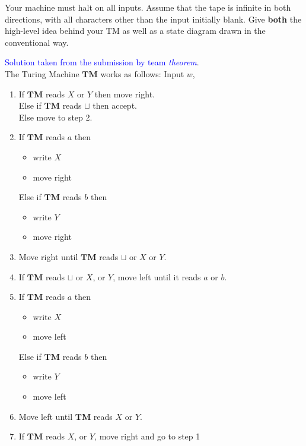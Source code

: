 \documentclass[a4page]{exam}
\begin{document}
\begin{questions}
  Your machine must halt on all inputs. Assume that the tape is infinite in both directions, with all characters other than the input initially blank. Give \textbf{both} the high-level idea behind your TM as well as a state diagram drawn in the conventional way. 
  \begin{solution}
    \textcolor{blue}{Solution taken from the submission by team \textit{theorem}}.\\
    The Turing Machine $\mathbf{TM}$ works as follows: Input $w$,
    \begin{enumerate}
    \item If $\mathbf{TM}$ reads $X$ or $Y$ then move right.\\
      Else if $\mathbf{TM}$ reads $\sqcup$ then accept. \\
      Else move to step 2. 
    \item If $\mathbf{TM}$ reads $a$ then
      \begin{itemize}
      \item write $X$
      \item move right
      \end{itemize}
      Else if $\mathbf{TM}$ reads $b$ then 
      \begin{itemize}
      \item write $Y$
      \item move right
      \end{itemize}
    \item Move right until $\mathbf{TM}$ reads $\sqcup$ or $X$ or $Y$.
    \item If $\mathbf{TM}$ reads $\sqcup$ or $X$, or $Y$, move left until it reads $a$ or $b$.
    \item If $\mathbf{TM}$ reads $a$ then 
      \begin{itemize}
      \item write $X$
      \item move left
      \end{itemize}
      Else if $\mathbf{TM}$ reads $b$ then 
      \begin{itemize}
      \item write $Y$
      \item move left
      \end{itemize}
    \item Move left until $\mathbf{TM}$ reads $X$ or $Y$.
    \item If $\mathbf{TM}$ reads $X$, or $Y$, move right and go to step 1
    \end{enumerate}
    

\end{solution}
\end{questions}
\end{document}
